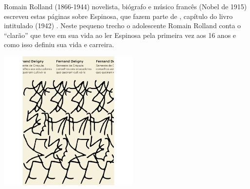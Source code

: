 \hspace*{-7cm}\hrulefill\hspace*{-7cm}

\medskip

\noindent{}Romain Rolland (1866-1944) novelista, biógrafo e músico francês (Nobel de 1915) escreveu estas páginas sobre Espinosa, que fazem parte de {}, capítulo do livro intitulado {} (1942) . Neste pequeno trecho o adolescente Romain Rolland conta o “clarão” que teve em sua vida ao ler Espinosa pela primeira vez aos 16 anos e como isso definiu sua vida e carreira.

\vfill

\hspace*{-.4cm}\begin{minipage}[c]{1\linewidth}
\small{
{}}
\end{minipage}

\pagebreak

\hspace{.5cm}

\begin{center}
\hspace*{-1cm}
\hspace*{1cm}\includegraphics[width=70mm]{./grid/deligny.jpeg}
\end{center}

